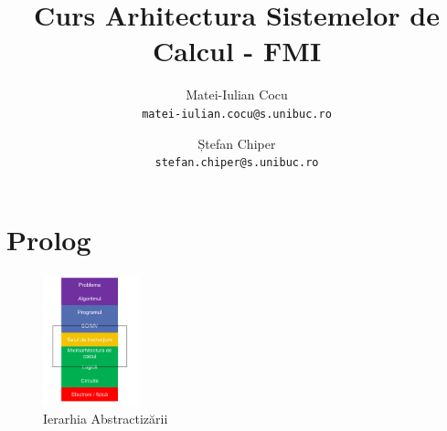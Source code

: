 \documentclass[a4paper,10pt]{article}
\title{\huge Curs Arhitectura Sistemelor de Calcul - FMI}
\author{
  Matei-Iulian Cocu\\
  \texttt{matei-iulian.cocu@s.unibuc.ro}
  \and
  Ștefan Chiper\\
  \texttt{stefan.chiper@s.unibuc.ro}
} \date{}
\begin{document}
\maketitle
\setcounter{tocdepth}{0}
\tableofcontents
\thispagestyle{empty}
\newpage

\section{Prolog}
\begin{figure}
    \centering
    \includegraphics[width=0.25\textwidth]{resources/ierarhia.png}
    \caption{Ierarhia Abstractizării}
\end{figure}
\end{document}

